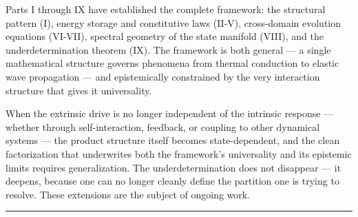 \documentclass[
  letterpaper,
  DIV=11,
  numbers=noendperiod]{scrartcl}
\begin{document}
Parts I through IX have established the complete framework: the
structural pattern (I), energy storage and constitutive laws (II-V),
cross-domain evolution equations (VI-VII), spectral geometry of the
state manifold (VIII), and the underdetermination theorem (IX). The
framework is both general --- a single mathematical structure governs
phenomena from thermal conduction to elastic wave propagation --- and
epistemically constrained by the very interaction structure that gives
it universality.

When the extrinsic drive is no longer independent of the intrinsic
response --- whether through self-interaction, feedback, or coupling to
other dynamical systems --- the product structure itself becomes
state-dependent, and the clean factorization that underwrites both the
framework's universality and its epistemic limits requires
generalization. The underdetermination does not disappear --- it
deepens, because one can no longer cleanly define the partition one is
trying to resolve. These extensions are the subject of ongoing work.

\begin{center}\rule{0.5\linewidth}{0.5pt}\end{center}
\end{document}
